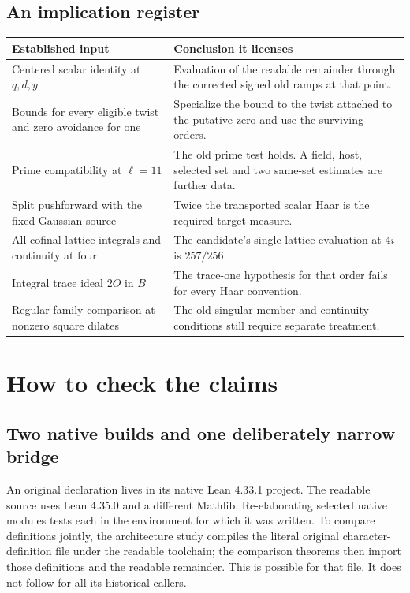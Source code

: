 \documentclass[12pt,letterpaper]{article}
\begin{document}
\subsection{An implication register}
\begin{center}\small\begin{tabularx}{\linewidth}{@{}YY@{}}\toprule
Established input & Conclusion it licenses\\\midrule
Centered scalar identity at $q,d,y$ & Evaluation of the readable remainder through the corrected signed old ramps at that point.\\
Bounds for every eligible twist and zero avoidance for one & Specialize the bound to the twist attached to the putative zero and use the surviving orders.\\
Prime compatibility at $\ell=11$ & The old prime test holds. A field, host, selected set and two same-set estimates are further data.\\
Split pushforward with the fixed Gaussian source & Twice the transported scalar Haar is the required target measure.\\
All cofinal lattice integrals and continuity at four & The candidate's single lattice evaluation at $4i$ is $257/256$.\\
Integral trace ideal $2O$ in $B$ & The trace-one hypothesis for that order fails for every Haar convention.\\
Regular-family comparison at nonzero square dilates & The old singular member and continuity conditions still require separate treatment.\\\bottomrule\end{tabularx}\end{center}


\section{How to check the claims}
\subsection{Two native builds and one deliberately narrow bridge}
An original declaration lives in its native Lean 4.33.1 project. The readable source uses Lean 4.35.0 and a different Mathlib. Re-elaborating selected native modules tests each in the environment for which it was written. To compare definitions jointly, the architecture study compiles the literal original character-definition file under the readable toolchain; the comparison theorems then import those definitions and the readable remainder. This is possible for that file. It does not follow for all its historical callers.
\end{document}
